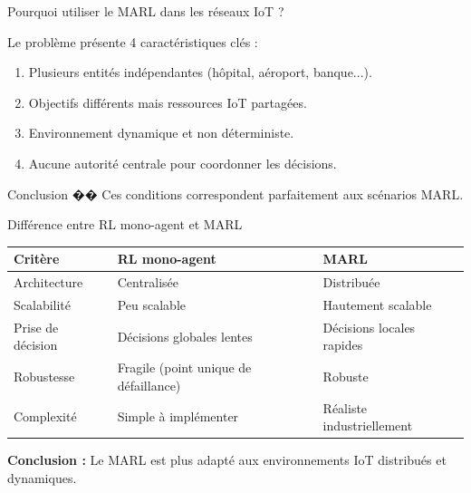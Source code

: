\documentclass{beamer}
\begin{document}
\begin{frame}{Pourquoi utiliser le MARL dans les réseaux IoT ?}

Le problème présente 4 caractéristiques clés :

\begin{enumerate}
    \item Plusieurs entités indépendantes (hôpital, aéroport, banque...).
    \item Objectifs différents mais ressources IoT partagées.
    \item Environnement dynamique et non déterministe.
    \item Aucune autorité centrale pour coordonner les décisions.
\end{enumerate}

\begin{block}{Conclusion}
�� Ces conditions correspondent parfaitement aux scénarios MARL.
\end{block}

\end{frame}

\begin{frame}{Différence entre RL mono-agent et MARL}

\centering
\renewcommand{\arraystretch}{1.5}

\begin{tabular}{|l|p{3.9cm}|p{3.9cm}|}
\hline
\textbf{Critère} & \textbf{RL mono-agent} & \textbf{MARL} \\
\hline
Architecture & Centralisée & Distribuée \\
\hline
Scalabilité & Peu scalable & Hautement scalable \\
\hline
Prise de décision & Décisions globales lentes & Décisions locales rapides \\
\hline
Robustesse & Fragile (point unique de défaillance) & Robuste \\
\hline
Complexité & Simple à implémenter & Réaliste industriellement \\
\hline
\end{tabular}

\vspace{0.4cm}

\textbf{Conclusion :}  
Le MARL est plus adapté aux environnements IoT distribués et dynamiques.

\end{frame}
\end{document}
